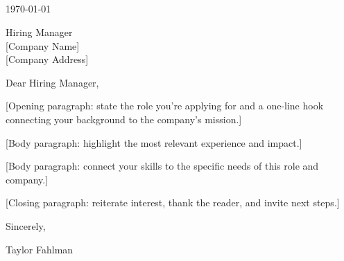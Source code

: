 \documentclass[line,margin]{res}
\begin{document}
\address{fahlmantaylor@gmail.com}
\address{github.com/fahlmant, linkedin.com/in/taylorfahlman}
\begin{resume}

\section{}
                    \today

                    \vspace{12pt}

                    Hiring Manager\\
                    {}[Company Name]\\
                    {}[Company Address]

                    \vspace{12pt}

                    Dear Hiring Manager,

                    \vspace{6pt}

                    [Opening paragraph: state the role you're applying for and a one-line hook connecting your background to the company's mission.]

                    \vspace{6pt}

                    [Body paragraph: highlight the most relevant experience and impact.]

                    \vspace{6pt}

                    [Body paragraph: connect your skills to the specific needs of this role and company.]

                    \vspace{6pt}

                    [Closing paragraph: reiterate interest, thank the reader, and invite next steps.]

                    \vspace{12pt}

                    Sincerely,

                    \vspace{6pt}

                    Taylor Fahlman

\end{resume}
\end{document}
